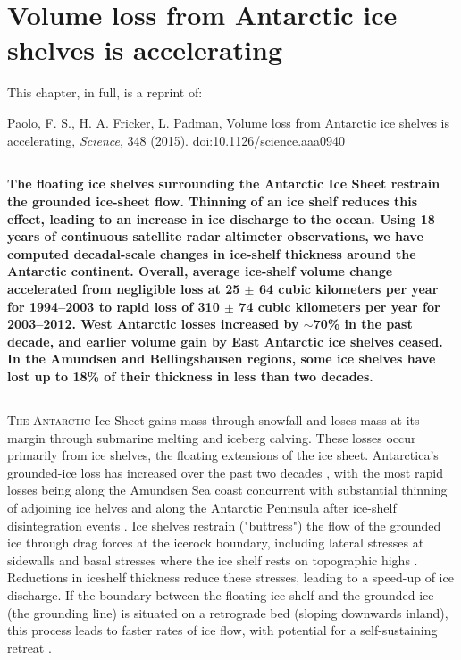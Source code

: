 


\chapter{Volume loss from Antarctic ice shelves is accelerating}

\noindent
This chapter, in full, is a reprint of:

\noindent
Paolo, F. S., H. A. Fricker, L. Padman, Volume loss from Antarctic ice shelves
is accelerating, {\it Science}, 348 (2015). doi:10.1126/science.aaa0940

\section*{}

\noindent
{\bf
The floating ice shelves surrounding the Antarctic Ice Sheet restrain the
groun\-ded ice-sheet flow. Thinning of an ice shelf reduces this effect, leading
to an increase in ice discharge to the ocean. Using 18 years of continuous
satellite radar altimeter observations, we have computed decadal-scale changes
in ice-shelf thickness around the Antarctic continent. Overall, average
ice-shelf volume change accelerated from negligible loss at 25 $\pm$ 64 cubic
kilometers per year for 1994--2003 to rapid loss of 310 $\pm$ 74 cubic
kilometers per year for 2003--2012. West Antarctic losses increased by
$\sim$70\% in the past decade, and earlier volume gain by East Antarctic ice
shelves ceased. In the Amundsen and Bellingshausen regions, some ice shelves
have lost up to 18\% of their thickness in less than two decades.
}

\section*{}

\noindent
\lettrine{T}{he Antarctic} Ice Sheet gains mass through snowfall and loses
mass at its margin through submarine melting and iceberg calving. These losses
occur primarily from ice shelves, the floating extensions of the ice sheet.
Antarctica's grounded-ice loss has increased over the past two decades
\parencite{Shepherd2012, Sutterley2014}, with the most rapid losses being along
the Amundsen Sea coast \parencite{Joughin2011} concurrent with substantial
thinning of adjoining ice helves \parencite{Shepherd2010, Pritchard2012} and
along the Antarctic Peninsula after ice-shelf disintegration events \parencite{
Scambos2004}. Ice shelves restrain ("buttress") the flow of the grounded ice
through drag forces at the icerock boundary, including lateral stresses at
sidewalls and basal stresses where the ice shelf rests on topographic highs
\parencite{Schoof2007, Goldberg2009}. Reductions in iceshelf thickness reduce
these stresses, leading to a speed-up of ice discharge. If the boundary between
the floating ice shelf and the grounded ice (the grounding line) is situated on
a retrograde bed (sloping downwards inland), this process leads to faster rates
of ice flow, with potential for a self-sustaining retreat \parencite{
Schoof2007, Favier2014, Joughin2014}.

